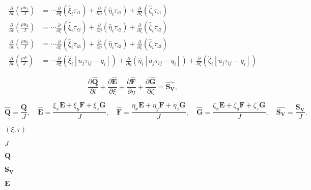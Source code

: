 \documentclass{article}
\begin{document}
\[ \begin{align} \frac{\partial}{\partial t}\left(\frac{\rho u_1}{J}\right) &= \cdots \frac{\partial}{\partial \xi}\left(\hat{\xi}_i\tau_{i1}\right) + \frac{\partial}{\partial \eta}\left(\hat{\eta}_i\tau_{i1}\right) + \frac{\partial}{\partial \zeta}\left(\hat{\zeta}_i\tau_{i1}\right) \\ \frac{\partial}{\partial t}\left(\frac{\rho u_2}{J}\right) &= \cdots \frac{\partial}{\partial \xi}\left(\hat{\xi}_i\tau_{i2}\right) + \frac{\partial}{\partial \eta}\left(\hat{\eta}_i\tau_{i2}\right) + \frac{\partial}{\partial \zeta}\left(\hat{\zeta}_i\tau_{i2}\right) \\ \frac{\partial}{\partial t}\left(\frac{\rho u_3}{J}\right) &= \cdots \frac{\partial}{\partial \xi}\left(\hat{\xi}_i\tau_{i3}\right) + \frac{\partial}{\partial \eta}\left(\hat{\eta}_i\tau_{i3}\right) + \frac{\partial}{\partial \zeta}\left(\hat{\zeta}_i\tau_{i3}\right) \\ \frac{\partial}{\partial t}\left(\frac{\rho E}{J}\right) &= \cdots \frac{\partial}{\partial \xi}\left(\hat{\xi}_i [ u_j \tau_{ij} - q_i ]\right) + \frac{\partial}{\partial \eta}\left(\hat{\eta}_i [ u_j \tau_{ij} - q_i ]\right) + \frac{\partial}{\partial \zeta}\left(\hat{\zeta}_i [ u_j \tau_{ij} - q_i ]\right) \end{align} \]
\pagebreak

\[ \begin{equation*} \frac{\partial \hat{\mathbf{Q}}}{\partial t}+\frac{\partial \hat{\mathbf{E}}}{\partial \xi}+\frac{\partial \hat{\mathbf{F}}}{\partial \eta}+\frac{\partial \hat{\mathbf{G}}}{\partial \zeta}=\hat{\mathbf{S_V}}, \end{equation*} \]
\pagebreak

\[ \begin{equation*} \hat{\mathbf{Q}}=\frac{\mathbf{Q}}{J}, \quad \hat{\mathbf{E}}=\frac{\xi_x \mathbf{E} +\xi_y \mathbf{F} +\xi_z \mathbf{G}}{J}, \quad \hat{\mathbf{F}}=\frac{\eta_x \mathbf{E}+\eta_y \mathbf{F} +\eta_z \mathbf{G}}{J},\quad \hat{\mathbf{G}}=\frac{\zeta_x \mathbf{E}+\zeta_y \mathbf{F} +\zeta_z \mathbf{G}}{J}, \quad \hat{\mathbf{S_V}}=\frac{\mathbf{S_V}}{J}. \end{equation*} \]
\pagebreak

$(\xi, \tau)$
\pagebreak

$J$
\pagebreak

$\mathbf{Q}$
\pagebreak

$\mathbf{S_V}$
\pagebreak

$\mathbf{E}$
\pagebreak
\end{document}
